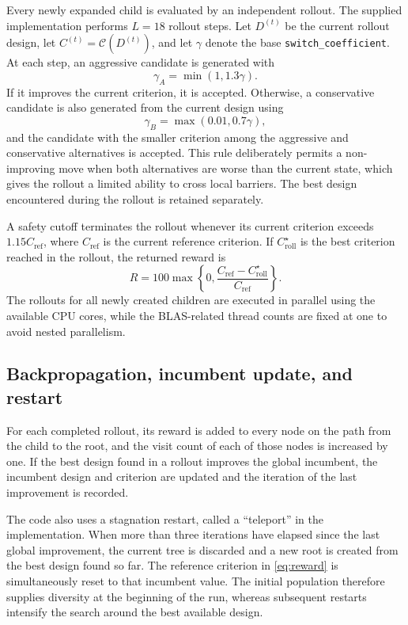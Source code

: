 \documentclass[twoside]{article}
\newcommand{\Crit}{\mathcal{C}}
\begin{document}
Every newly expanded child is evaluated by an independent rollout. The supplied
implementation performs $L=18$ rollout steps. Let $D^{(t)}$ be the current
rollout design, let $C^{(t)}=\Crit(D^{(t)})$, and let $\gamma$ denote the base
{\tt switch\_coefficient}. At each step, an aggressive candidate is generated
with
\[
    \gamma_A=\min(1,1.3\gamma).
\]
If it improves the current criterion, it is accepted. Otherwise, a conservative
candidate is also generated from the current design using
\[
    \gamma_B=\max(0.01,0.7\gamma),
\]
and the candidate with the smaller criterion among the aggressive and
conservative alternatives is accepted. This rule deliberately permits a
non-improving move when both alternatives are worse than the current state,
which gives the rollout a limited ability to cross local barriers. The best
design encountered during the rollout is retained separately.

A safety cutoff terminates the rollout whenever its current criterion exceeds
$1.15C_{\mathrm{ref}}$, where $C_{\mathrm{ref}}$ is the current reference
criterion. If $C_{\mathrm{roll}}^{\star}$ is the best criterion reached in the
rollout, the returned reward is
\begin{equation}\label{eq:reward}
    R=100\max\left\{0,
       \frac{C_{\mathrm{ref}}-C_{\mathrm{roll}}^{\star}}
            {C_{\mathrm{ref}}}\right\}.
\end{equation}
The rollouts for all newly created children are executed in parallel using the
available CPU cores, while the BLAS-related thread counts are fixed at one to
avoid nested parallelism.

\subsection{Backpropagation, incumbent update, and restart}

For each completed rollout, its reward is added to every node on the path from
the child to the root, and the visit count of each of those nodes is increased
by one. If the best design found in a rollout improves the global incumbent,
the incumbent design and criterion are updated and the iteration of the last
improvement is recorded.

The code also uses a stagnation restart, called a ``teleport'' in the
implementation. When more than three iterations have elapsed since the last
global improvement, the current tree is discarded and a new root is created
from the best design found so far. The reference criterion in
\eqref{eq:reward} is simultaneously reset to that incumbent value. The initial
population therefore supplies diversity at the beginning of the run, whereas
subsequent restarts intensify the search around the best available design.
\end{document}
